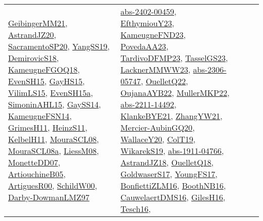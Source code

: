 {\begin{longtable}{lp{3cm}>{\raggedright}p{6cm}>{\raggedright}p{6cm}p{8cm}}
\href{papers/GeibingerMM21.pdf}{GeibingerMM21}\cite{GeibingerMM21}, \href{articles/AstrandJZ20.pdf}{AstrandJZ20}\cite{AstrandJZ20}, \href{articles/SacramentoSP20.pdf}{SacramentoSP20}\cite{SacramentoSP20}, \href{papers/YangSS19.pdf}{YangSS19}\cite{YangSS19}, \href{papers/DemirovicS18.pdf}{DemirovicS18}\cite{DemirovicS18}, \href{papers/KameugneFGOQ18.pdf}{KameugneFGOQ18}\cite{KameugneFGOQ18}, \href{papers/EvenSH15.pdf}{EvenSH15}\cite{EvenSH15}, \href{papers/GayHS15.pdf}{GayHS15}\cite{GayHS15}, \href{papers/VilimLS15.pdf}{VilimLS15}\cite{VilimLS15}, \href{articles/EvenSH15a.pdf}{EvenSH15a}\cite{EvenSH15a}, \href{articles/SimoninAHL15.pdf}{SimoninAHL15}\cite{SimoninAHL15}, \href{papers/GaySS14.pdf}{GaySS14}\cite{GaySS14}, \href{articles/KameugneFSN14.pdf}{KameugneFSN14}\cite{KameugneFSN14}, \href{papers/GrimesH11.pdf}{GrimesH11}\cite{GrimesH11}, \href{papers/HeinzS11.pdf}{HeinzS11}\cite{HeinzS11}, \href{articles/KelbelH11.pdf}{KelbelH11}\cite{KelbelH11}, \href{papers/MouraSCL08.pdf}{MouraSCL08}\cite{MouraSCL08}, \href{papers/MouraSCL08a.pdf}{MouraSCL08a}\cite{MouraSCL08a}, \href{articles/LiessM08.pdf}{LiessM08}\cite{LiessM08}, \href{papers/MonetteDD07.pdf}{MonetteDD07}\cite{MonetteDD07}, \href{papers/ArtiouchineB05.pdf}{ArtiouchineB05}\cite{ArtiouchineB05}, \href{articles/ArtiguesR00.pdf}{ArtiguesR00}\cite{ArtiguesR00}, \href{articles/SchildW00.pdf}{SchildW00}\cite{SchildW00}, \href{articles/Darby-DowmanLMZ97.pdf}{Darby-DowmanLMZ97}\cite{Darby-DowmanLMZ97} & \href{articles/abs-2402-00459.pdf}{abs-2402-00459}\cite{abs-2402-00459}, \href{papers/EfthymiouY23.pdf}{EfthymiouY23}\cite{EfthymiouY23}, \href{papers/KameugneFND23.pdf}{KameugneFND23}\cite{KameugneFND23}, \href{papers/PovedaAA23.pdf}{PovedaAA23}\cite{PovedaAA23}, \href{papers/TardivoDFMP23.pdf}{TardivoDFMP23}\cite{TardivoDFMP23}, \href{papers/TasselGS23.pdf}{TasselGS23}\cite{TasselGS23}, \href{articles/LacknerMMWW23.pdf}{LacknerMMWW23}\cite{LacknerMMWW23}, \href{articles/abs-2306-05747.pdf}{abs-2306-05747}\cite{abs-2306-05747}, \href{papers/OuelletQ22.pdf}{OuelletQ22}\cite{OuelletQ22}, \href{papers/OujanaAYB22.pdf}{OujanaAYB22}\cite{OujanaAYB22}, \href{articles/MullerMKP22.pdf}{MullerMKP22}\cite{MullerMKP22}, \href{articles/abs-2211-14492.pdf}{abs-2211-14492}\cite{abs-2211-14492}, \href{papers/KlankeBYE21.pdf}{KlankeBYE21}\cite{KlankeBYE21}, \href{articles/ZhangYW21.pdf}{ZhangYW21}\cite{ZhangYW21}, \href{papers/Mercier-AubinGQ20.pdf}{Mercier-AubinGQ20}\cite{Mercier-AubinGQ20}, \href{articles/WallaceY20.pdf}{WallaceY20}\cite{WallaceY20}, \href{papers/ColT19.pdf}{ColT19}\cite{ColT19}, \href{articles/WikarekS19.pdf}{WikarekS19}\cite{WikarekS19}, \href{articles/abs-1911-04766.pdf}{abs-1911-04766}\cite{abs-1911-04766}, \href{papers/AstrandJZ18.pdf}{AstrandJZ18}\cite{AstrandJZ18}, \href{papers/OuelletQ18.pdf}{OuelletQ18}\cite{OuelletQ18}, \href{papers/GoldwaserS17.pdf}{GoldwaserS17}\cite{GoldwaserS17}, \href{papers/YoungFS17.pdf}{YoungFS17}\cite{YoungFS17}, \href{papers/BonfiettiZLM16.pdf}{BonfiettiZLM16}\cite{BonfiettiZLM16}, \href{papers/BoothNB16.pdf}{BoothNB16}\cite{BoothNB16}, \href{papers/CauwelaertDMS16.pdf}{CauwelaertDMS16}\cite{CauwelaertDMS16}, \href{papers/GilesH16.pdf}{GilesH16}\cite{GilesH16}, \href{papers/Tesch16.pdf}{Tesch16}\cite{Tesch16}, 
\end{longtable}}
